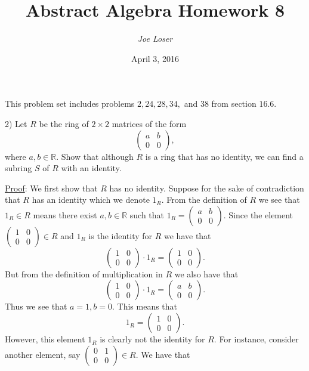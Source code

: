 \documentclass{article}
\title{Abstract Algebra Homework 8}
\author{\textit{Joe Loser}}
\date{April 3, 2016}
\begin{document}
\maketitle

This problem set includes problems $2, 24, 28, 34,$ and $38$ from section $16.6$.

2) Let $R$ be the ring of $2 \times 2$ matrices of the form
$$ \begin{pmatrix}
	a & b \\
	0 & 0
\end{pmatrix},$$ 
where $a, b \in \mathbb{R}$. Show that although $R$ is a ring that has no identity, we can find a subring $S$ of $R$ with an identity.

\underline{Proof}: We first show that $R$ has no identity. Suppose for the sake of contradiction that $R$ has an identity which we denote $1_R$. From the definition of $R$ we see that $1_R \in R$ means there exist $a, b \in \mathbb{R}$ such that $1_R = \begin{pmatrix}
	a & b \\
	0 & 0
\end{pmatrix}$. Since the element
$\begin{pmatrix}
	1 & 0 \\
	0 & 0
\end{pmatrix} \in R$ and $1_R$ is the identity for $R$ we have that
$$
	\begin{pmatrix}
	1 & 0 \\
	0 & 0
	\end{pmatrix} \cdot 1_R = 
	\begin{pmatrix}
	1 & 0 \\
	0 & 0
	\end{pmatrix}.
$$
But from the definition of multiplication in $R$ we also have that 
$$
	\begin{pmatrix}
	1 & 0 \\
	0 & 0
	\end{pmatrix} \cdot 1_R = 
	\begin{pmatrix}
	a & b \\
	0 & 0
	\end{pmatrix}.
$$
Thus we see that $a = 1, b = 0$. This means that $$1_R = 
\begin{pmatrix}
1 & 0 \\
0 & 0
\end{pmatrix}.$$ However, this element $1_R$ is clearly not the identity for $R$. For instance, consider another element, say $
\begin{pmatrix}
	0 & 1 \\
	0 & 0
\end{pmatrix} \in R$. We have that 
\end{document}
